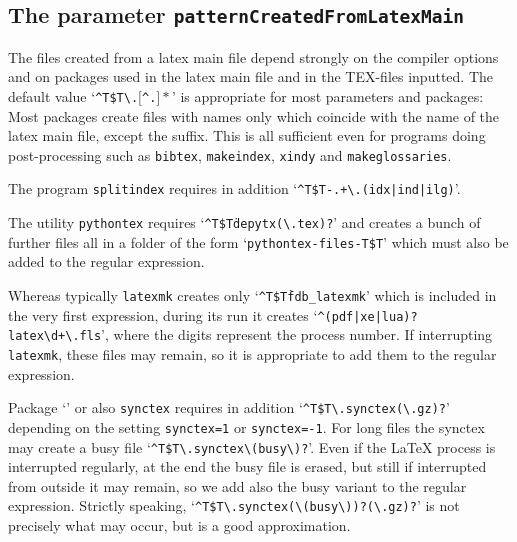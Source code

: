 \subsection{The parameter \texttt{patternCreatedFromLatexMain}}%
\label{subsec:patternCreatedFromLatexMain}

The files created from a latex main file 
depend strongly on the compiler options 
and on packages used in the latex main file 
and in the TEX-files inputted. 
The default value 
`\texttt{\^{}T\$T\textbackslash.$[$\^{}.$]*$}' 
is appropriate for most parameters and packages: 
Most packages create files with names only 
which coincide with the name of the latex main file, except the suffix. 
This is all sufficient even for programs doing post-processing 
such as \texttt{bibtex}, \texttt{makeindex}, \texttt{xindy} and 
\texttt{makeglossaries}. 

The program \texttt{splitindex} requires in addition 
`\texttt{\^{}T\$T-.+\textbackslash.(idx|ind|ilg)}'. %

The utility \texttt{pythontex} requires 
`\texttt{\^{}T\$T\.depytx(\textbackslash.tex)?}' %
and creates a bunch of further files all in a folder of the form 
`\texttt{pythontex-files-T\$T}' which must also be added to the regular expression. 

Whereas typically \texttt{latexmk} creates only `\texttt{\^{}T\$T\.fdb\_latexmk}' 
which is included in the very first expression, 
during its run it creates `\texttt{\^{}(pdf|xe|lua)?latex\textbackslash d+\textbackslash.fls}', %
where the digits represent the process number. 
If interrupting \texttt{latexmk}, these files may remain, 
so it is appropriate to add them to the regular expression. 

Package `' or also \texttt{synctex} requires in addition 
`\texttt{\^{}T\$T\textbackslash.synctex(\textbackslash.gz)?}' depending on the setting %
\texttt{synctex=1} or \texttt{synctex=-1}. 
For long files the synctex may create a busy file 
`\texttt{\^{}T\$T\textbackslash.synctex\textbackslash(busy\textbackslash)?}'. 
Even if the \LaTeX{} process is interrupted regularly, 
at the end the busy file is erased, 
but still if interrupted from outside it may remain, 
so we add also the busy variant to the regular expression. 
Strictly speaking, 
`\texttt{\^{}T\$T\textbackslash.synctex(\textbackslash(busy\textbackslash))?(\textbackslash.gz)?}' %
is not precisely what may occur, but is a good approximation. 

